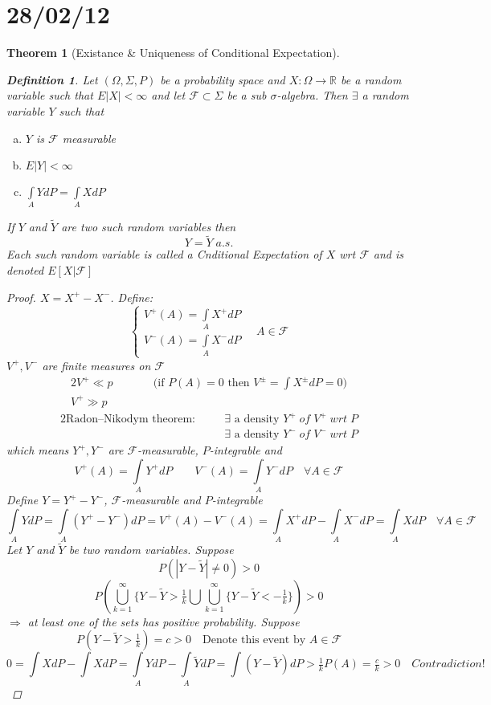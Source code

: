 \documentclass[12pt]{article}
\def\FF{\mathbb{F}}
\def\RR{\mathbb{R}}
\def\FF{\mathcal{F}}
\newtheorem{theorem}{Theorem}[section]
\newtheorem{definition}{Definition}[section]
\begin{document}
\section{28/02/12}
\begin{theorem}[Existance \& Uniqueness of Conditional Expectation]
\begin{definition}
Let $(\Omega , \Sigma , P)$ be a probability space and $X:\Omega \rightarrow \RR$ be a random variable such that $E|X|<\infty$ and let $\mathcal{F} \subset \Sigma$ be a sub $\sigma$-algebra. Then $\exists$ a random variable $Y$ such that
\begin{enumerate}[(a)]
\item $Y$ is $\mathcal{F}$ measurable
\item $E|Y| < \infty$
\item $\int\limits_{A}YdP = \int\limits_{A}XdP$
\end{enumerate}
If $Y$ and $\tilde{Y}$ are two such random variables then 
\[Y = \tilde{Y} \; a.s.\]
Each such random variable is called a Cnditional Expectation of $X$ wrt $\mathcal{F}$ and is denoted $E[X|\mathcal{F}]$
\end{definition}
\begin{proof}
$X = X^+ - X^-$. Define:
\[ \begin{cases} V^+(A) = \int\limits_{A}X^+ dP \\ V^-(A) = \int\limits_{A}X^- dP \end{cases} \quad A\in \mathcal{F}\]
$V^+, V^-$ are finite measures on $\FF$ 
\begin{alignat*}{2} V^+ \ll p &\qquad &\text{(if $P(A) = 0$ then } V^{\pm} = \int X^{\pm}dP = 0) \\
V^+ \gg p &\qquad & \quad
\end{alignat*}
\begin{alignat*}{2} \text{Radon–Nikodym theorem:} & \quad &\exists \text{ a density }Y^+ \; of \; V^+ \; wrt\;P \\
\: & \quad &\exists \text{ a density }Y^- \; of \; V^- \; wrt\;P \end{alignat*}
which means $Y^+ , Y^-$ are $\FF$-measurable, $P$-integrable and 
\[ V^+(A) = \int\limits_{A}Y^+dP \qquad V^-(A) = \int\limits_{A}Y^-dP\quad \forall A \in \FF\]
Define $Y = Y^+ - Y^-$, $\FF$-measurable and $P$-integrable
\[\int\limits_{A}YdP = \int\limits_{A}(Y^+ - Y^-)dP = V^+(A) -V^-(A) = \int\limits_{A}X^+dP - \int\limits_{A}X^-dP = \int\limits_{A}XdP \quad \forall A \in \FF\]
Let $Y$ and $\tilde{Y}$ be two random variables. Suppose
\[P(|Y-\tilde{Y}| \neq 0)>0\]
\[P\left(\bigcup_{k=1}^{\infty}\{Y - \tilde{Y} >\tfrac{1}{k}\bigcup \bigcup_{k=1}^{\infty}\{Y - \tilde{Y} < -\tfrac{1}{k}\}\right) >0\]
$\Rightarrow$ at least one of the sets has positive probability. Suppose
\[P(Y-\tilde{Y} > \tfrac{1}{k}) = c >0 \quad \text{Denote this event by }A\in \FF\]
\[0= \int XdP - \int XdP = \int\limits_{A}YdP - \int\limits_{A}\tilde{Y}dP = \int (Y - \tilde{Y}) dP > \tfrac{1}{k}P(A) = \tfrac{c}{k}> 0  \quad Contradiction! \]
\end{proof}
\end{theorem}
\end{document}
